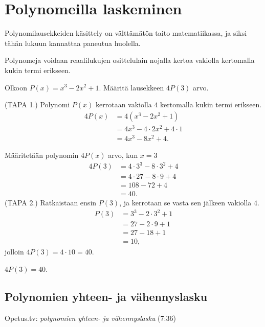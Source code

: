 \section{Polynomeilla laskeminen}

Polynomilausekkeiden käsittely on välttämätön taito matematiikassa, ja siksi tähän lukuun kannattaa paneutua huolella.

Polynomeja voidaan reaalilukujen osittelulain nojalla kertoa vakiolla kertomalla kukin termi erikseen.

\begin{esimerkki}
	Olkoon $P(x)=x^3-2x^2+1$. Määritä lausekkeen $4P(3)$ arvo.
	\begin{esimratk}
	(TAPA 1.)
		Polynomi $P(x)$ kerrotaan vakiolla $4$ kertomalla kukin termi erikseen.
		\begin{align*}
		 4P(x)&=4(x^3-2x^2+1)\\
		 &=4x^3-4\cdot2x^2+4\cdot1\\
		 &=4x^3-8x^2+4.
		\end{align*}
		
		Määritetään polynomin $4P(x)$ arvo, kun $x=3$
		\begin{align*}
		 4P(3)&=4\cdot3^3-8\cdot3^2+4\\
			&=4\cdot27-8\cdot9+4\\
			&=108-72+4\\
			&=40.
		\end{align*}
	(TAPA 2.)
		Ratkaistaan ensin $P(3)$, ja kerrotaan se vasta sen jälkeen vakiolla $4$.
		\begin{align*}
		 P(3)&=3^3-2\cdot3^2+1\\
			&=27-2\cdot9+1\\
			&=27-18+1\\
			&=10,
		\end{align*}
		jolloin $4P(3)=4\cdot10=40$.
	\end{esimratk}
	\begin{esimvast}
	 $4P(3)=40$.
	\end{esimvast}
\end{esimerkki}


\subsection{Polynomien yhteen- ja vähennyslasku}

{Opetus.tv: \emph{polynomien yhteen- ja vähennyslasku} (7:36)}

